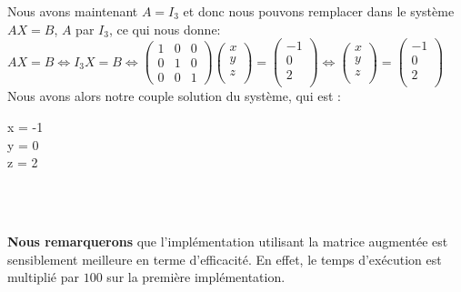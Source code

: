 Nous avons maintenant $A=I_3$ et donc nous pouvons remplacer dans le système $AX=B$, $A$ par $I_3$, ce qui nous donne: \vspace{4pt}\\
$
AX=B \iff I_3X=B
\iff
    \begin{pmatrix}
        1 & 0 & 0\\
        0 & 1 & 0 \\
        0 & 0 & 1
    \end{pmatrix}
    \begin{pmatrix}
    	x \\
		y \\
		z \\
    \end{pmatrix}
    =
    \begin{pmatrix}
    	-1\\
		0 \\
		2 \\
    \end{pmatrix}
    \iff
    \begin{pmatrix}
    	x \\
		y \\
		z \\
    \end{pmatrix}
    =
    \begin{pmatrix}
    	-1\\
		0 \\
		2 \\
    \end{pmatrix}$
\vspace{6pt}\\
Nous avons alors notre couple solution du système, qui est : \vspace{4pt}\\
\begin{System}
  x = -1 \\
  y = 0 \\
  z = 2 
\end{System}\\

\newpage

\newpage

\\
\textbf{Nous remarquerons} que l'implémentation utilisant la matrice augmentée est sensiblement meilleure en terme d'efficacité. En effet, le temps d'exécution est multiplié par $100$ sur la première implémentation.

